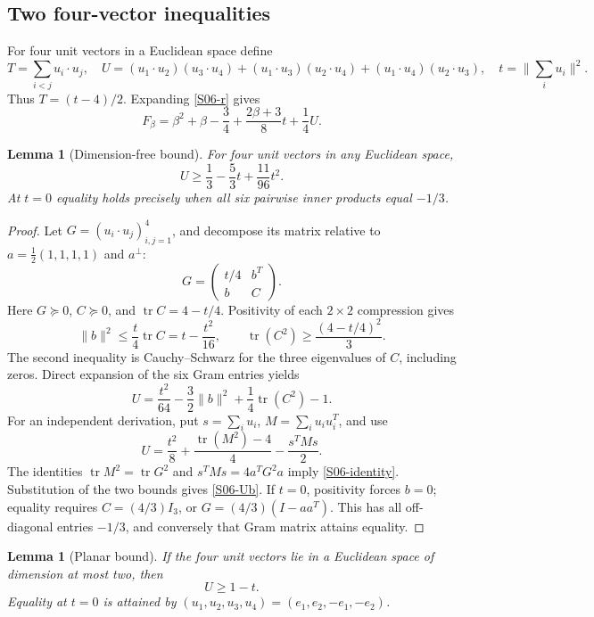 \documentclass[11pt,a4paper]{article}
\newtheorem{lemma}[theorem]{Lemma}
\theoremstyle{definition}\newtheorem{definition}[theorem]{Definition}
\theoremstyle{remark}\newtheorem{remark}[theorem]{Remark}
\DeclareMathOperator{\tr}{tr}\DeclareMathOperator{\supp}{supp}\DeclareMathOperator{\TV}{TV}
\numberwithin{equation}{section}
\begin{document}
\subsection{Two four-vector inequalities}\label{S06-sec-3}
For four unit vectors in a Euclidean space define
\[
 T=\sum_{i<j}u_i\cdot u_j,\quad
 U=(u_1\cdot u_2)(u_3\cdot u_4)
 +(u_1\cdot u_3)(u_2\cdot u_4)
 +(u_1\cdot u_4)(u_2\cdot u_3),
 \quad t=\Big\|\sum_i u_i\Big\|^2.
\]
Thus $T=(t-4)/2$. Expanding \eqref{S06-r} gives
\begin{equation}\label{S06-F}
 F_\beta=\beta^2+\beta-\frac34+\frac{2\beta+3}{8}t+\frac14U.
\end{equation}
\begin{lemma}[Dimension-free bound]\label{S06-gram}
For four unit vectors in any Euclidean space,
\begin{equation}\label{S06-Ub}
 U\ge\frac13-\frac53t+\frac{11}{96}t^2.
\end{equation}
At $t=0$ equality holds precisely when all six pairwise inner products equal $-1/3$.
\end{lemma}
\begin{proof}
Let $G=(u_i\cdot u_j)_{i,j=1}^4$, and decompose its matrix relative to $a=\tfrac12(1,1,1,1)$ and $a^\perp$:
\[
 G=\begin{pmatrix}t/4&b^T\\b&C\end{pmatrix}.
\]
Here $G\succeq0$, $C\succeq0$, and $\tr C=4-t/4$. Positivity of each $2\times2$ compression gives
\[
 \|b\|^2\le\frac t4\tr C=t-\frac{t^2}{16},\qquad
 \tr(C^2)\ge\frac{(4-t/4)^2}{3}.
\]
The second inequality is Cauchy--Schwarz for the three eigenvalues of $C$, including zeros. Direct expansion of the six Gram entries yields
\begin{equation}\label{S06-identity}
 U=\frac{t^2}{64}-\frac32\|b\|^2+\frac14\tr(C^2)-1.
\end{equation}
For an independent derivation, put $s=\sum_i u_i$, $M=\sum_i u_i u_i^T$, and use
\[
 U=\frac{t^2}{8}+\frac{\tr(M^2)-4}{4}-\frac{s^TMs}{2}.
\]
The identities $\tr M^2=\tr G^2$ and $s^TMs=4a^TG^2a$ imply \eqref{S06-identity}. Substitution of the two bounds gives \eqref{S06-Ub}. If $t=0$, positivity forces $b=0$; equality requires $C=(4/3)I_3$, or $G=(4/3)(I-aa^T)$. This has all off-diagonal entries $-1/3$, and conversely that Gram matrix attains equality.
\end{proof}
\begin{lemma}[Planar bound]\label{S06-plane}
If the four unit vectors lie in a Euclidean space of dimension at most two, then
\begin{equation}\label{S06-Up}
 U\ge1-t.
\end{equation}
Equality at $t=0$ is attained by $(u_1,u_2,u_3,u_4)=(e_1,e_2,-e_1,-e_2)$.
\end{lemma}
\end{document}
